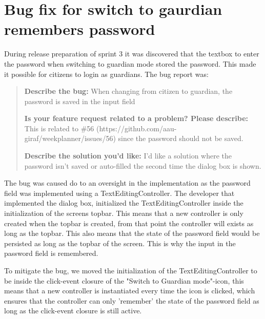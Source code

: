 \section{Bug fix for switch to gaurdian remembers password}
During release preparation of sprint 3 it was discovered that the textbox to enter the password when switching to guardian mode stored the password. This made it possible for citizens to login as guardians. The bug report was:

\begin{quote}
  \textbf{Describe the bug:} When changing from citizen to guardian, the password is saved in the input field

  \textbf{Is your feature request related to a problem? Please describe:} This is related to \#56 (https://github.com/aau-giraf/weekplanner/issues/56) since the password should not be saved.

  \textbf{Describe the solution you'd like: } I'd like a solution where the password isn't saved or auto-filled the second time the dialog box is shown.
\end{quote}

The bug was caused do to an oversight in the implementation as the password field was implemented using a TextEditingController. The developer that implemented the dialog box, initialized the TextEditingController inside the initialization of the screens topbar. This means that a new controller is only created when the topbar is created, from that point the controller will exists as long as the topbar. This also means that the state of the password field would be persisted as long as the topbar of the screen. This is why the input in the password field is remembered.

To mitigate the bug, we moved the initialization of the TextEditingController to be inside the click-event closure of the "Switch to Guardian mode"-icon, this means that a new controller is instantiated every time the icon is clicked, which ensures that the controller can only 'remember' the state of the password field as long as the click-event closure is still active.
